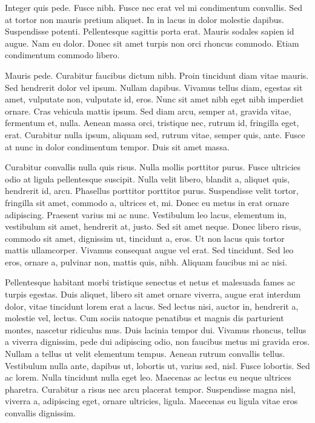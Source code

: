 Integer quis pede. Fusce nibh. Fusce nec erat vel mi condimentum
convallis. Sed at tortor non mauris pretium aliquet. In in lacus in
dolor molestie dapibus. Suspendisse potenti. Pellentesque sagittis
porta erat. Mauris sodales sapien id augue. Nam eu dolor. Donec sit
amet turpis non orci rhoncus commodo. Etiam condimentum commodo
libero.

Mauris pede. Curabitur faucibus dictum nibh. Proin tincidunt diam
vitae mauris. Sed hendrerit dolor vel ipsum. Nullam dapibus. Vivamus
tellus diam, egestas sit amet, vulputate non, vulputate id, eros. Nunc
sit amet nibh eget nibh imperdiet ornare. Cras vehicula mattis
ipsum. Sed diam arcu, semper at, gravida vitae, fermentum et,
nulla. Aenean massa orci, tristique nec, rutrum id, fringilla eget,
erat. Curabitur nulla ipsum, aliquam sed, rutrum vitae, semper quis,
ante. Fusce at nunc in dolor condimentum tempor. Duis sit amet massa. 

Curabitur convallis nulla quis risus. Nulla mollis porttitor
purus. Fusce ultricies odio at ligula pellentesque suscipit. Nulla
velit libero, blandit a, aliquet quis, hendrerit id, arcu. Phasellus
porttitor porttitor purus. Suspendisse velit tortor, fringilla sit
amet, commodo a, ultrices et, mi. Donec eu metus in erat ornare
adipiscing. Praesent varius mi ac nunc. Vestibulum leo lacus,
elementum in, vestibulum sit amet, hendrerit at, justo. Sed sit amet
neque. Donec libero risus, commodo sit amet, dignissim ut, tincidunt
a, eros. Ut non lacus quis tortor mattis ullamcorper. Vivamus
consequat augue vel erat. Sed tincidunt. Sed leo eros, ornare a,
pulvinar non, mattis quis, nibh. Aliquam faucibus mi ac nisi.

Pellentesque habitant morbi tristique senectus et netus et malesuada
fames ac turpis egestas. Duis aliquet, libero sit amet ornare viverra,
augue erat interdum dolor, vitae tincidunt lorem erat a lacus. Sed
lectus nisi, auctor in, hendrerit a, molestie vel, lectus. Cum sociis
natoque penatibus et magnis dis parturient montes, nascetur ridiculus
mus. Duis lacinia tempor dui. Vivamus rhoncus, tellus a viverra
dignissim, pede dui adipiscing odio, non faucibus metus mi gravida
eros. Nullam a tellus ut velit elementum tempus. Aenean rutrum
convallis tellus. Vestibulum nulla ante, dapibus ut, lobortis ut,
varius sed, nisl. Fusce lobortis. Sed ac lorem. Nulla tincidunt nulla
eget leo. Maecenas ac lectus eu neque ultrices pharetra. Curabitur a
risus nec arcu placerat tempor. Suspendisse magna nisl, viverra a,
adipiscing eget, ornare ultricies, ligula. Maecenas eu ligula vitae
eros convallis dignissim. 

